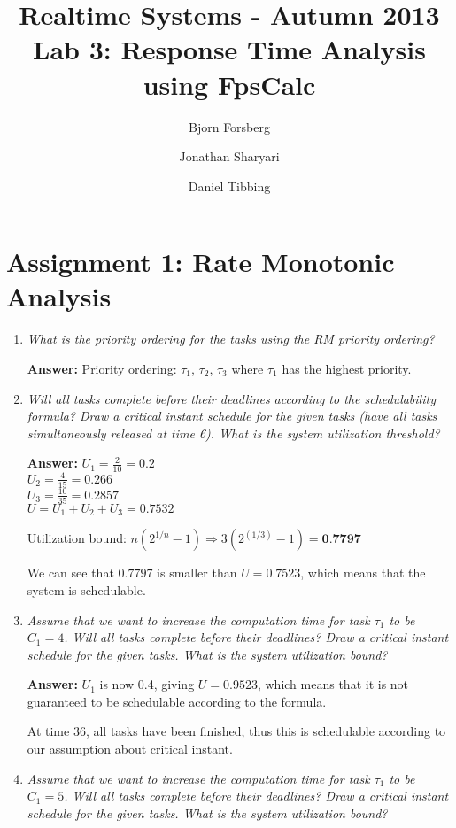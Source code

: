 \documentclass[a4paper,10pt]{article}
\title{Realtime Systems - Autumn 2013 \\ \textbf{Lab 3: Response Time Analysis using FpsCalc}}
\author{Bjorn Forsberg \and Jonathan Sharyari \and Daniel Tibbing}
\newcommand{\answer}{\textbf{Answer: }}
\begin{document}
\maketitle

\section{Assignment 1: Rate Monotonic Analysis}

\begin{enumerate}
	\item \emph{What is the priority ordering for the tasks using the RM priority ordering?}
	
	\answer Priority ordering: $\tau_1$, $\tau_2$, $\tau_3$ where $\tau_1$ has the highest priority.
	
	\item \emph{Will all tasks complete before their deadlines according to the schedulability formula? Draw a critical instant schedule for the given tasks (have all tasks simultaneously released at time 6). What is the system utilization threshold?}
	
	\answer $U_1 = \frac{2}{10} = 0.2$ \\
	$U_2 = \frac{4}{15} = 0.266$ \\
	$U_3 = \frac{10}{35} = 0.2857$ \\
	$U = U_1 + U_2 + U_3 = 0.7532$
	
	Utilization bound: $n(2^{1/n} - 1) \Rightarrow 3(2^(1/3) - 1) = \textbf{0.7797}$
	
	We can see that $0.7797$ is smaller than $U = 0.7523$, which means that the system is schedulable.
	
	
	\item \emph{Assume that we want to increase the computation time for task $\tau_1$ to be $C_1 = 4$. Will all tasks complete before their deadlines? Draw a critical instant schedule for the given tasks. What is the system utilization bound?}
	
	\answer $U_1$ is now 0.4, giving $U = 0.9523$, which means that it is not guaranteed to be schedulable  according to the formula.
	
	
	At time 36, all tasks have been finished, thus this is schedulable according to our assumption about critical instant.
	
	\item \emph{Assume that we want to increase the computation time for task $\tau_1$ to be $C_1 = 5$. Will all tasks complete before their deadlines? Draw a critical instant schedule for the given tasks. What is the system utilization bound?}
	

\end{enumerate}
\end{document}
